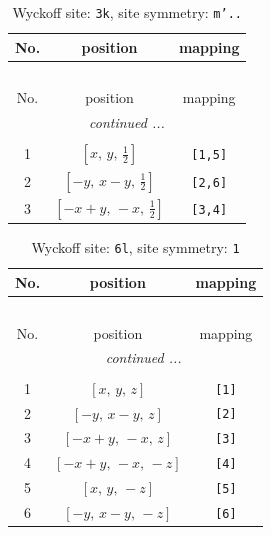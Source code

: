 \documentclass[fleqn,8pt]{jsarticle}
\begin{document}
\begin{longtable}{ccc}
\caption{Wyckoff site: {\tt 3k}, site symmetry: {\tt m'..}}
 \\
 \hline \hline
No. & position & mapping \\ \hline \endfirsthead

\multicolumn{2}{l}{\tablename\ \thetable{}} \\
 \hline \hline
No. & position & mapping \\ \hline \endhead

 \hline \hline
\multicolumn{2}{r}{\footnotesize\it continued ...} \\ \endfoot

 \hline \hline
\multicolumn{2}{r}{} \\ \endlastfoot

1 & $\left[ x,\, y,\, \frac{1}{2} \right]$ & {\tt [1,5]} \\ \hline
2 & $\left[ - y,\, x - y,\, \frac{1}{2} \right]$ & {\tt [2,6]} \\ \hline
3 & $\left[ - x + y,\, - x,\, \frac{1}{2} \right]$ & {\tt [3,4]} \\
\end{longtable}
\renewcommand{\arraystretch}{1.2}
\begin{longtable}{ccc}
\caption{Wyckoff site: {\tt 6l}, site symmetry: {\tt 1}}
 \\
 \hline \hline
No. & position & mapping \\ \hline \endfirsthead

\multicolumn{2}{l}{\tablename\ \thetable{}} \\
 \hline \hline
No. & position & mapping \\ \hline \endhead

 \hline \hline
\multicolumn{2}{r}{\footnotesize\it continued ...} \\ \endfoot

 \hline \hline
\multicolumn{2}{r}{} \\ \endlastfoot

1 & $\left[ x,\, y,\, z \right]$ & {\tt [1]} \\ \hline
2 & $\left[ - y,\, x - y,\, z \right]$ & {\tt [2]} \\ \hline
3 & $\left[ - x + y,\, - x,\, z \right]$ & {\tt [3]} \\ \hline
4 & $\left[ - x + y,\, - x,\, - z \right]$ & {\tt [4]} \\ \hline
5 & $\left[ x,\, y,\, - z \right]$ & {\tt [5]} \\ \hline
6 & $\left[ - y,\, x - y,\, - z \right]$ & {\tt [6]} \\
\end{longtable}
\end{document}
